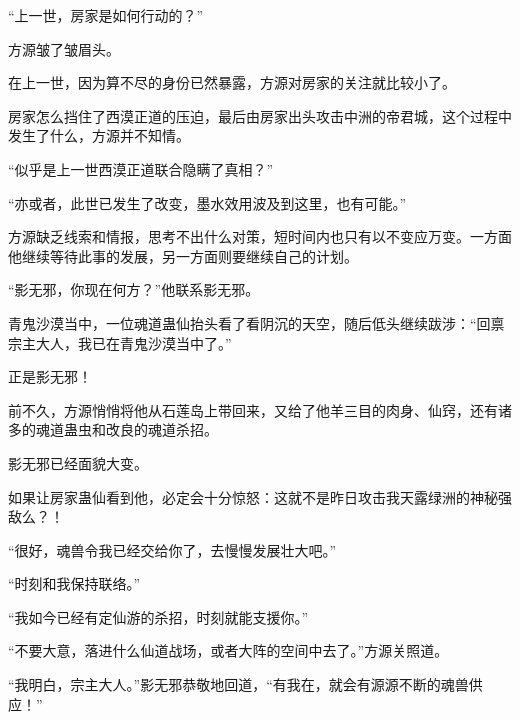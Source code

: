 \begin{this_body}
“上一世，房家是如何行动的？”

方源皱了皱眉头。

在上一世，因为算不尽的身份已然暴露，方源对房家的关注就比较小了。

房家怎么挡住了西漠正道的压迫，最后由房家出头攻击中洲的帝君城，这个过程中发生了什么，方源并不知情。

“似乎是上一世西漠正道联合隐瞒了真相？”

“亦或者，此世已发生了改变，墨水效用波及到这里，也有可能。”

方源缺乏线索和情报，思考不出什么对策，短时间内也只有以不变应万变。一方面他继续等待此事的发展，另一方面则要继续自己的计划。

“影无邪，你现在何方？”他联系影无邪。

青鬼沙漠当中，一位魂道蛊仙抬头看了看阴沉的天空，随后低头继续跋涉：“回禀宗主大人，我已在青鬼沙漠当中了。”

正是影无邪！

前不久，方源悄悄将他从石莲岛上带回来，又给了他羊三目的肉身、仙窍，还有诸多的魂道蛊虫和改良的魂道杀招。

影无邪已经面貌大变。

如果让房家蛊仙看到他，必定会十分惊怒：这就不是昨日攻击我天露绿洲的神秘强敌么？！

“很好，魂兽令我已经交给你了，去慢慢发展壮大吧。”

“时刻和我保持联络。”

“我如今已经有定仙游的杀招，时刻就能支援你。”

“不要大意，落进什么仙道战场，或者大阵的空间中去了。”方源关照道。

“我明白，宗主大人。”影无邪恭敬地回道，“有我在，就会有源源不断的魂兽供应！”

\end{this_body}

